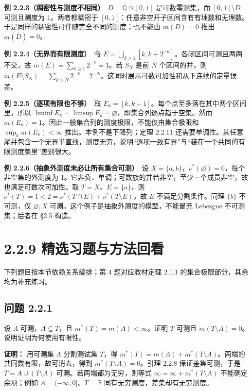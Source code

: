 \documentclass[11pt,a4paper]{article}
\begin{document}
\textbf{例 2.2.3（稠密性与测度不相同）}　\(D=\mathbb Q\cap[0,1]\)
是可数零测集，而 \([0,1]\setminus D\) 可测且测度为 \(1\)。两者都稠密于
\([0,1]\)：任意非空开子区间含有有理数和无理数。于是同样的稠密性可伴随完全不同的测度；也不能由
\(m(D)=0\) 推出 \(m(\overline D)=0\)。

\textbf{例 2.2.4（无界而有限测度）}　令
\(E=\bigcup_{k\ge1}[k,k+2^{-k}]\)。各闭区间可测且两两不交，故
\(m(E)=\sum_{k\ge1}2^{-k}=1\)。若 \(S_N\) 是前 \(N\) 个区间的并，则
\(m(E\setminus S_N)=\sum_{k>N}2^{-k}=2^{-N}\)。这同时展示可数可加性和从下连续的定量误差。

\textbf{例 2.2.5（逐项有限也不够）}　取
\(E_k=[k,k+1]\)。每个点至多落在其中两个区间里，所以
\(\liminf E_k=\limsup E_k=\varnothing\)，即集合列逐点趋于空集。然而
\(m(E_k)=1\)。因此一般集合列的测度极限，不能仅由集合极限和
\(\sup_km(E_k)<\infty\) 推出。本例不是下降列；定理 2.2.11
还需要单调性。其任意尾并包含一个无界半直线，测度无穷，说明``逐项一致有界''与``装在一个共同的有限测度集里''差别很大。

\textbf{例 2.2.6（抽象外测度未必让所有集合可测）}　设
\(X=\{a,b\}\)，\(\nu^*(\varnothing)=0\)，每个非空集的外测度为
\(1\)。它非负、单调；可数族的并若非空，至少一个成员非空，故也满足可数次可加性。取
\(T=X\)、\(E=\{a\}\)，则
\(\nu^*(T)=1<2=\nu^*(T\cap E)+\nu^*(T\setminus E)\)，故 \(E\)
不满足分割条件。同理 \(\{b\}\) 不可测，仅 \(\varnothing,X\)
可测。这个例子是抽象外测度的模型，不能冒充 Lebesgue 不可测集；后者在
§2.5 构造。

\section[\S{}2.2.9
精选习题与方法回看]{2.2.9
精选习题与方法回看}\label{ux7cbeux9009ux4e60ux9898ux4e0eux65b9ux6cd5ux56deux770b}

下列题目按本节依赖关系编排；第 4 题对应教材定理 2.1.1
的集合极限部分，其余均为补充练习。

\subsection{问题 2.2.1}\label{ux95eeux9898-2.2.1}

设 \(A\) 可测，\(A\subseteq T\)，且 \(m^*(T)=m(A)<\infty\)。证明 \(T\)
可测且 \(m(T\setminus A)=0\)。说明证明为何使用有限性。

\textbf{证明：} 用可测集 \(A\) 分割测试集 \(T\)，得
\(m^*(T)=m(A)+m^*(T\setminus A)\)。两端的共同数有限，故可消去，得到
\(m^*(T\setminus A)=0\)。引理 2.2.8 保证差集可测，于是
\(T=A\cup(T\setminus A)\) 可测。若两端都为无穷，则等式
\(\infty=\infty+m^*(T\setminus A)\) 不能确定余项；例如
\(A=(-\infty,0]\)、\(T=\mathbb R\) 同有无穷测度，差集却有无穷测度。
\end{document}
